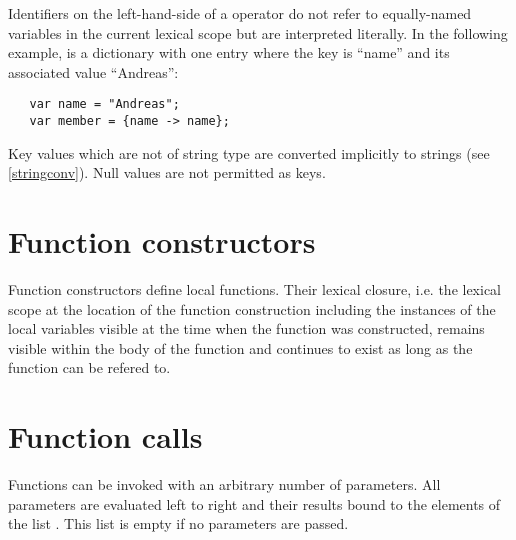 \noindent
Identifiers on the left-hand-side of a \token{->} operator do not
refer to equally-named variables in the current lexical scope but are
interpreted literally. In the following example,  is a
dictionary with one entry where the key is ``name'' and its associated
value ``Andreas'':

\begin{lstlisting}
   var name = "Andreas";
   var member = {name -> name};
\end{lstlisting}

\noindent
Key values which are not of string type are converted implicitly
to strings (see \ref{stringconv}). Null values are not permitted
as keys.

\section{Function constructors}

Function constructors define local functions.
Their lexical closure,
i.e. the lexical scope at the location of the function construction
including the instances of the local variables visible at the time
when the function was constructed, remains visible within
the body of the function and continues to exist as long as the function
can be refered to.

\begin{grammar}
      \produces {} 
\end{grammar}

\section{Function calls}

Functions can be invoked with an arbitrary number of parameters.
All parameters are evaluated left to right and their results
bound to the elements of the list . This list is
empty if no parameters are passed.

\begin{grammar}
      \produces {} \lextoken{(} \lextoken{)} \\
      \produces {}
         \lextoken{(}  \lextoken{)}
\end{grammar}

